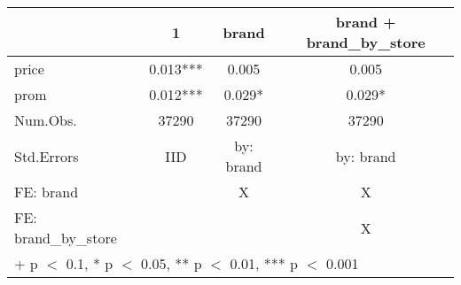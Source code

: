 \begin{table}
\centering
\begin{tabular}[t]{lccc}
\toprule
  & 1 & brand & brand + brand\_by\_store\\
\midrule
price & \num{0.013}*** & \num{0.005} & \num{0.005}\\
prom & \num{0.012}*** & \num{0.029}* & \num{0.029}*\\
\midrule
Num.Obs. & \num{37290} & \num{37290} & \num{37290}\\
Std.Errors & IID & by: brand & by: brand\\
FE: brand &  & X & X\\
FE: brand_by_store &  &  & X\\
\bottomrule
\multicolumn{4}{l}{\rule{0pt}{1em}+ p $<$ 0.1, * p $<$ 0.05, ** p $<$ 0.01, *** p $<$ 0.001}\\
\end{tabular}
\end{table}
